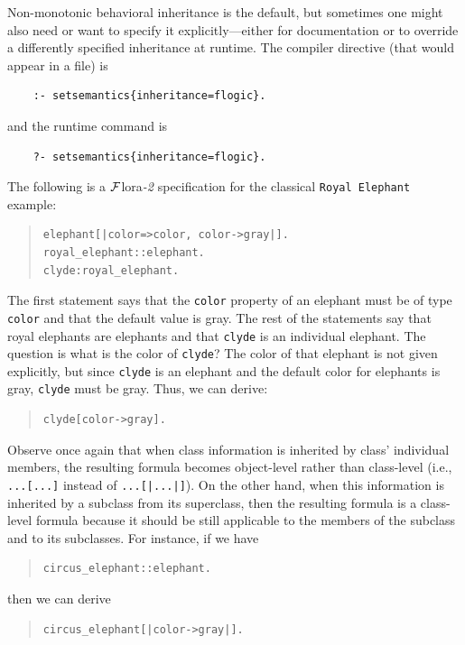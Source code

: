 \documentclass[11pt]{article}
\newcommand{\FLORA}{{\mbox{\sc ${\cal F}${lora}\rm\emph{-2}}}\xspace}
\newcommand{\FLSYSTEM}{\FLORA}
\begin{document}
Non-monotonic behavioral inheritance is the default, but sometimes one
might also need or want
to specify it explicitly---either for documentation or to override
a differently specified inheritance at runtime. The compiler directive
(that would appear in a file) is
\begin{verbatim}
    :- setsemantics{inheritance=flogic}.
\end{verbatim}
and the runtime command is
\begin{verbatim}
    ?- setsemantics{inheritance=flogic}.
\end{verbatim}
The following is a \FLSYSTEM specification
for the classical {\tt Royal Elephant} example:
\begin{quote}
\begin{verbatim}
elephant[|color=>color, color->gray|].
royal_elephant::elephant.
clyde:royal_elephant.
\end{verbatim}
\end{quote}
The first statement says that the \texttt{color} property of an elephant
must be of type \texttt{color} and that the default value is gray.  
The rest of the statements say that royal elephants are elephants and that
\texttt{clyde} is an individual elephant. 
The question is what is the color of {\tt clyde}? The color of that
elephant is not given explicitly, but since
{\tt clyde} is an elephant and the default color for elephants is gray,
{\tt clyde}
must be gray. Thus, we can derive:
\begin{quote}
\begin{verbatim}
clyde[color->gray].  
\end{verbatim}
\end{quote}
Observe once again that when class information is inherited by class'
individual members, the resulting formula becomes object-level rather than 
class-level (i.e., \texttt{...[...]} instead of \texttt{...[|...|]}).  
On the other
hand, when this information is inherited by a subclass from its superclass,
then the resulting formula is a class-level formula because it should be
still applicable to the members of the subclass and to its subclasses.
For instance, if we have
\begin{quote}
\begin{verbatim}
circus_elephant::elephant.
\end{verbatim}
\end{quote}
then we can derive 
\begin{quote}
\begin{verbatim}
circus_elephant[|color->gray|].  
\end{verbatim}
\end{quote}
\end{document}
